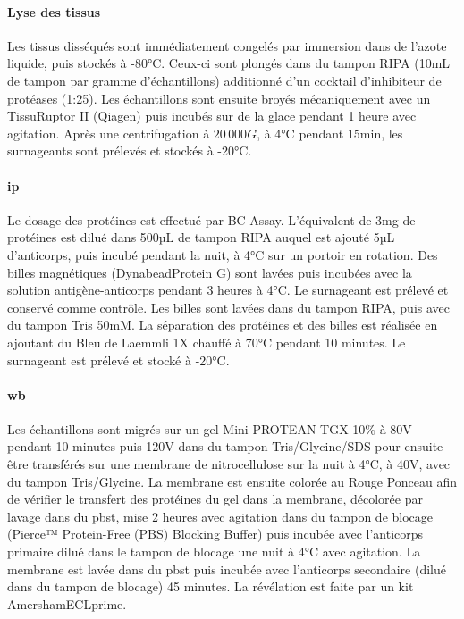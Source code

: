 \paragraph{Lyse des tissus}
\label{par:lyse}
	Les tissus disséqués sont immédiatement congelés par immersion dans de l'azote liquide, puis stockés à -80°C. Ceux-ci sont plongés dans du tampon RIPA (10mL de tampon par gramme d'échantillons) additionné d'un cocktail d'inhibiteur de protéases (1:25). Les échantillons sont ensuite broyés mécaniquement avec un TissuRuptor II (Qiagen\textregistered) puis incubés sur de la glace pendant 1 heure avec agitation. Après une centrifugation à $20\,000G$, à 4°C pendant 15min, les surnageants sont prélevés et stockés à -20°C. 
	
\paragraph{\Acrlong{ip}}
\label{par:ip}
	Le dosage des protéines est effectué par BC Assay. L'équivalent de 3mg de protéines est dilué dans 500µL de tampon RIPA auquel est ajouté 5µL d'anticorps, puis incubé pendant la nuit, à 4°C sur un portoir en rotation. Des billes magnétiques (Dynabead\textregistered Protein G) sont lavées puis incubées avec la solution antigène-anticorps pendant 3 heures à 4°C. Le surnageant est prélevé et conservé comme contrôle. Les billes sont lavées dans du tampon RIPA, puis avec du tampon Tris 50mM. La séparation des protéines et des billes est réalisée en ajoutant du Bleu de Laemmli 1X chauffé à 70°C pendant 10 minutes. Le surnageant est prélevé et stocké à -20°C. 
	
\paragraph{\Acrlong{wb}}
\label{par:wb}
	Les échantillons sont migrés sur un gel Mini-PROTEAN\textregistered{} TGX 10\% à 80V pendant 10 minutes puis 120V dans du tampon Tris/Glycine/SDS pour ensuite être transférés sur une membrane de nitrocellulose sur la nuit à 4°C, à 40V, avec du tampon Tris/Glycine. La membrane est ensuite colorée au Rouge Ponceau afin de vérifier le transfert des protéines du gel dans la membrane, décolorée par lavage dans du \acrshort{pbst}, mise 2 heures avec agitation dans du tampon de blocage (Pierce™ Protein-Free (PBS) Blocking Buffer) puis incubée avec l'anticorps primaire dilué dans le tampon de blocage une nuit à 4°C avec agitation. La membrane est lavée dans du \acrshort{pbst} puis incubée avec l'anticorps secondaire (dilué dans du tampon de blocage) 45 minutes. La révélation est faite par un kit Amersham\texttrademark ECL\texttrademark prime.
		
